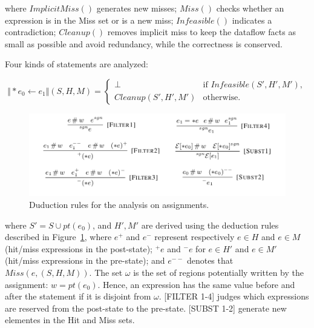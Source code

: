 where $ImplicitMiss()$ generates new misses;
$Miss()$ checks whether an expression is in the Miss set or is a new miss; 
$Infeasible()$ indicates a contradiction;
$Cleanup()$ removes implicit miss to keep the dataflow facts as small as possible and avoid redundancy, while the correctness is conserved.

Four kinds of statements are analyzed:


\[
\Vert *e_0 \gets e_1 \Vert(S,H,M)=\begin{cases}
\bot& \text{if $Infeasible(S',H',M')$},\\
Cleanup(S',H',M')& \text{otherwise}.
\end{cases}
\]


\begin{figure}
  \centering
  \includegraphics[width=1.0\columnwidth]{figs/rules_assignment}
   \caption{Duduction rules for the analysis on assignments.}
   \label{fig:rule_ass}
\end{figure}

where $S'=S\cup pt(e_0)$, and $H',M'$ are derived using the deduction rules 
described in Figure~\ref{fig:rule_ass}, where $e^+$ and $e^-$ represent 
respectively $e\in H$ and $e\in M$ (hit/miss expressions in the post-state); 
$^+e$ and $^-e$ for $e\in H'$ and $e\in M'$ (hit/miss expressions in the 
pre-state); and $e^{--}$ denotes that $Miss(e,(S,H,M))$. The set $\omega$ is 
the set of regions potentially written by the assignment: $w=pt(e_0)$. Hence,
an expression has the same value before and after the statement if it is 
disjoint from $\omega$. 
[FILTER 1-4] judges which expressions are reserved from the post-state to the 
pre-state. [SUBST 1-2] generate new elementes in the Hit and Miss sets.



